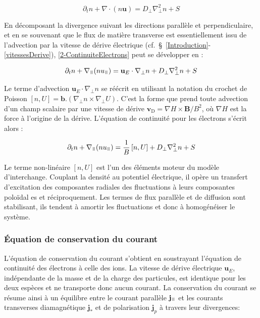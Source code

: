 \begin{refsection}
\begin{equation}
\label{2-ContinuiteElectrons}
\partial_t n + \nabla\cdot(n\mathbf{u}) = D_\perp\nabla^2_\perp n + S
\end{equation}

En décomposant la divergence suivant les directions parallèle et
perpendiculaire, et en se souvenant que le flux de matière transverse est
essentiellement issu de l'advection par la vitesse de dérive électrique
(cf.~\S~\ref{Introduction}-\ref{vitessesDerive}), \eqref{2-ContinuiteElectrons}
peut se développer en :

\begin{equation}
\label{2-ContinuiteElectrons2}
\partial_t n + \nabla_\para(nu_{\para}) =
\mathbf{u}_E\cdot\nabla_\perp n + D_\perp\nabla^2_\perp n + S
\end{equation}

Le terme d'advection $\mathbf{u}_E\cdot\nabla_\perp
n$ se réécrit en utilisant la notation
du crochet de Poisson $[n,U]=\mathbf{b}.(\nabla_\perp n\times\nabla_\perp U)$.
C'est la forme que prend toute advection d'un champ scalaire par une vitesse de
dérive $\mathbf{v}_\text{D}=\nabla H\times\mathbf{B}/B^2$, où $\nabla H$ est la
force à l'origine de la dérive. L'équation de continuité pour les électrons
s'écrit alors :

\begin{equation}
\label{2-eqContinuiteFinale}
\partial_t n + \nabla_{\para}(nu_{\para}) =
\frac{1}{B}\left[n,U\right] + D_\perp\nabla^2_\perp n + S
\end{equation}

Le terme non-linéaire $[n,U]$ est l'un des éléments moteur du modèle
d'interchange. Couplant la densité au potentiel électrique, il opère un
transfert d'excitation des composantes radiales des fluctuations à leurs
composantes poloïdal es et réciproquement. Les termes de flux parallèle et de
diffusion sont stabilisant, ils tendent à
amortir les fluctuations et donc à homogénéiser le système.

\subsubsection{Équation de conservation du courant}
L'équation de conservation du courant s'obtient en soustrayant l'équation de
continuité des électrons à celle des ions. La vitesse de dérive électrique
$\mathbf{u}_E$, indépendante de la masse et de la charge des particules,
est identique pour les deux espèces et ne transporte donc aucun courant. 
La conservation du courant se résume ainsi à un équilibre entre le courant
parallèle $\mathbf{j}_\para$ et les courants transverses diamagnétique
$\mathbf{j}_*$ et de polarisation $\mathbf{j}_p$ à travers leur
divergences:


\end{refsection}
